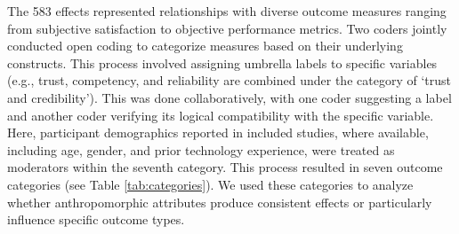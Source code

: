 \documentclass[lettersize,journal]{IEEEtran}
\begin{document}
The 583 effects represented relationships with diverse outcome measures ranging from subjective satisfaction to objective performance metrics. Two coders jointly conducted open coding to categorize measures based on their underlying constructs. This process involved assigning umbrella labels to specific variables (e.g., trust, competency, and reliability are combined under the category of `trust and credibility'). This was done collaboratively, with one coder suggesting a label and another coder verifying its logical compatibility with the specific variable. %
Here, participant demographics reported in included studies, where available, including age, gender, and prior technology experience, were treated as moderators within the seventh category.
This process resulted in seven outcome categories (see Table \ref{tab:categories}). We used these categories to analyze whether anthropomorphic attributes produce consistent effects or particularly influence specific outcome types. %
\end{document}
